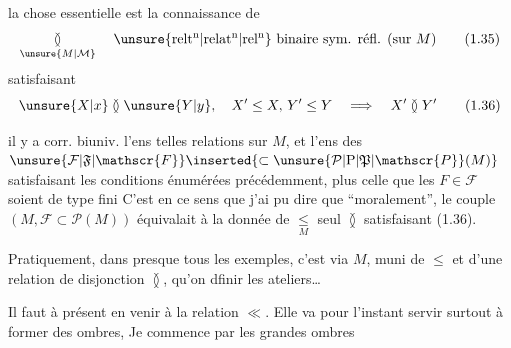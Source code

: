 
la chose essentielle est la connaissance de
\[
\underset{\unsure{M|\mathcal{M}}}{\between}\quad\text{\unsure{relt\textsuperscript{n}|relat\textsuperscript{n}|rel\textsuperscript{n}} binaire sym. réfl. (sur }M\text{)}
\tag*{(1.35)}
\]
 satisfaisant
\[
\unsure{X|x}\between\unsure{Y|y},\quad X'\leq X,\,Y'\leq Y\quad\Longrightarrow\quad X'\between Y'
\tag*{(1.36)}
\]


il y a corr. biuniv.  l'ens  telles relations sur $M$, et l'ens des $\unsure{\mathcal{F}|\mathfrak{F}|\mathscr{F}}\inserted{\subset\unsure{\mathcal{P}|\mathrm{P}|\mathfrak{P}|\mathscr{P}}(M)}$ satisfaisant les conditions énumérées précédemment, plus celle que les $F\in\mathcal{F}$ soient  de type fini C'est en ce sens que j'ai pu dire que ``moralement'', le couple $(M,\mathcal{F}\subset\mathcal{P}(M))$ équivalait à  la donnée de $\underset{M}{\leqslant}$ seul  $\between$ satisfaisant (1.36).


Pratiquement, dans presque tous les exemples, c'est via $M$, muni de $\leq$ et d'une relation de disjonction $\between$, qu'on dfinir les ateliers\ldots

Il faut à présent en venir à la relation $\ll$.  Elle va pour l'instant servir surtout à former des ombres, Je commence par les grandes ombres
